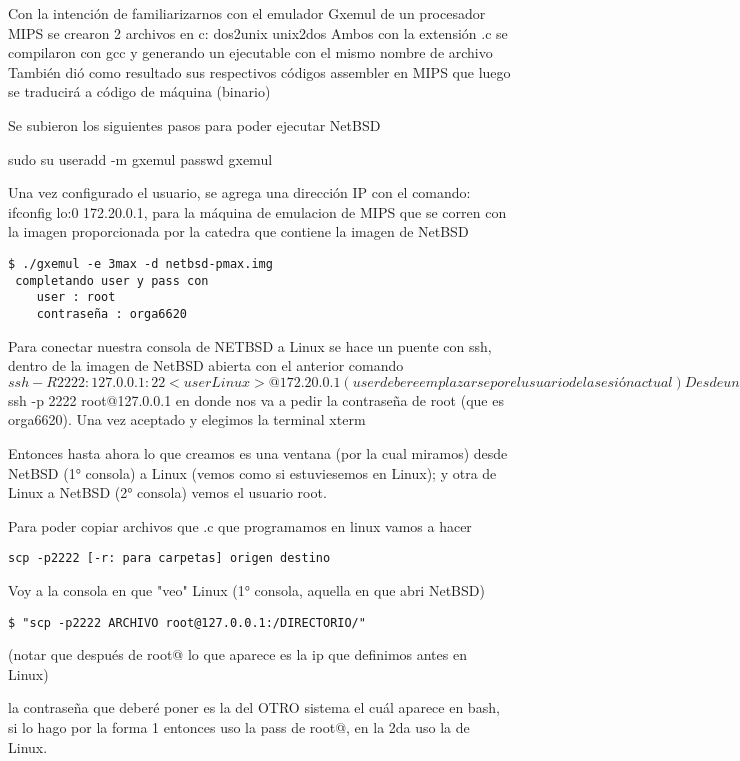 \documentclass[titlepage,a4paper]{article}
\begin{document}
Con la intención de familiarizarnos con el emulador Gxemul de un procesador MIPS se crearon 2 archivos en c:
dos2unix
unix2dos
Ambos con la extensión .c se compilaron con gcc y generando un ejecutable con el mismo nombre de archivo
También dió como resultado sus respectivos códigos assembler en MIPS que luego se traducirá a código de máquina (binario)

Se subieron los siguientes pasos para poder ejecutar NetBSD

sudo su
useradd -m gxemul
passwd gxemul

Una vez configurado el usuario, se agrega una dirección IP con el comando:
ifconfig lo:0 172.20.0.1, para la máquina de emulacion de MIPS que se corren con la imagen proporcionada por la catedra que contiene la imagen de NetBSD
\begin{lstlisting}
$ ./gxemul -e 3max -d netbsd-pmax.img
 completando user y pass con
	user : root
	contraseña : orga6620

\end{lstlisting}
Para conectar nuestra consola de NETBSD  a Linux se hace un puente con ssh, dentro de la imagen de NetBSD abierta con el anterior comando
$ ssh -R 2222:127.0.0.1:22 <userLinux>@172.20.0.1	 (user debe reemplazarse por el usuario de la sesión actual)

Desde una nueva consola de Linux (en la que no está abierto NetBSD) $ ssh -p 2222 root@127.0.0.1 en donde nos va a pedir la contraseña de root (que es orga6620). Una vez aceptado y elegimos la terminal xterm
	
Entonces hasta ahora lo que creamos es una ventana (por la cual miramos) desde NetBSD (1° consola) a Linux (vemos como si estuviesemos en Linux); y otra de Linux a NetBSD (2° consola) vemos el usuario root.

Para poder copiar archivos que .c que programamos en linux vamos a hacer 
\begin{lstlisting}
scp -p2222 [-r: para carpetas] origen destino

\end{lstlisting}
Voy a la consola en que "veo" Linux (1° consola, aquella en que abri NetBSD)

\begin{lstlisting}
$ "scp -p2222 ARCHIVO root@127.0.0.1:/DIRECTORIO/"
\end{lstlisting}
(notar que después de root@ lo que aparece es la ip que definimos antes en Linux)


la contraseña que deberé poner es la del OTRO sistema el cuál aparece en bash, si lo hago por la forma 1 entonces uso la pass de root@, en la 2da uso la de Linux.
\end{document}
